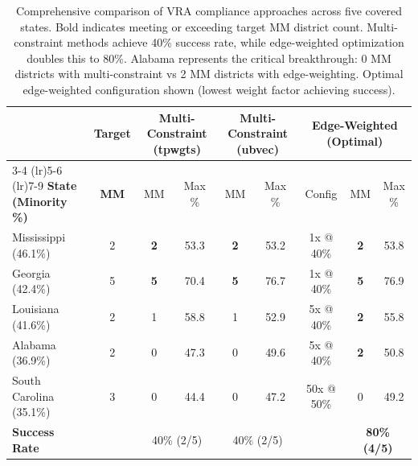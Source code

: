 \begin{table}[t]
\centering
\small
\begin{tabular}{@{}lcccccccc@{}}
\toprule
& \multirow{2}{*}{\textbf{Target}} & \multicolumn{2}{c}{\textbf{Multi-Constraint (tpwgts)}} & \multicolumn{2}{c}{\textbf{Multi-Constraint (ubvec)}} & \multicolumn{3}{c}{\textbf{Edge-Weighted (Optimal)}} \\
\cmidrule(lr){3-4} \cmidrule(lr){5-6} \cmidrule(lr){7-9}
\textbf{State (Minority \%)} & \textbf{MM} & MM & Max \% & MM & Max \% & Config & MM & Max \% \\
\midrule
Mississippi (46.1\%) & 2 & \textbf{2} & 53.3 & \textbf{2} & 53.2 & 1x @ 40\% & \textbf{2} & 53.8 \\
Georgia (42.4\%) & 5 & \textbf{5} & 70.4 & \textbf{5} & 76.7 & 1x @ 40\% & \textbf{5} & 76.9 \\
Louisiana (41.6\%) & 2 & 1 & 58.8 & 1 & 52.9 & 5x @ 40\% & \textbf{2} & 55.8 \\
Alabama (36.9\%) & 2 & 0 & 47.3 & 0 & 49.6 & 5x @ 40\% & \textbf{2} & 50.8 \\
South Carolina (35.1\%) & 3 & 0 & 44.4 & 0 & 47.2 & 50x @ 50\% & 0 & 49.2 \\
\midrule
\textbf{Success Rate} & & \multicolumn{2}{c}{40\% (2/5)} & \multicolumn{2}{c}{40\% (2/5)} & & \multicolumn{2}{c}{\textbf{80\% (4/5)}} \\
\bottomrule
\end{tabular}
\caption{Comprehensive comparison of VRA compliance approaches across five covered states. Bold indicates meeting or exceeding target MM district count. Multi-constraint methods achieve 40\% success rate, while edge-weighted optimization doubles this to 80\%. Alabama represents the critical breakthrough: 0 MM districts with multi-constraint vs 2 MM districts with edge-weighting. Optimal edge-weighted configuration shown (lowest weight factor achieving success).}
\label{tab:comprehensive_comparison}
\end{table}

